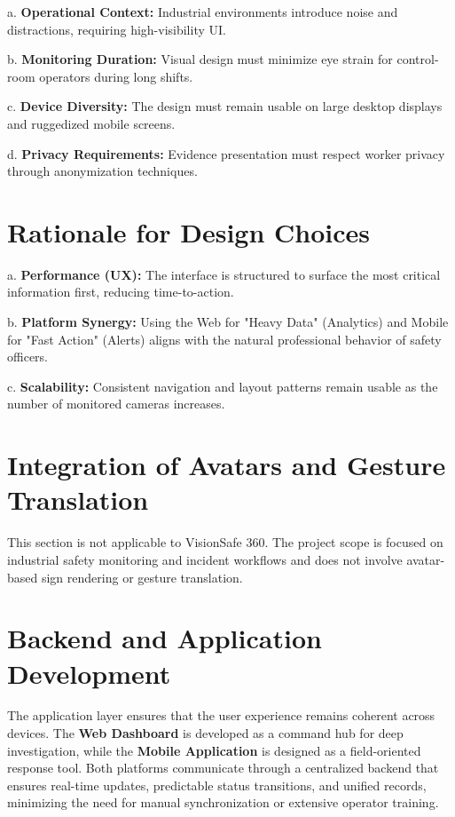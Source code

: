 a. \textbf{Operational Context:} Industrial environments introduce noise and distractions, requiring high-visibility UI.

b. \textbf{Monitoring Duration:} Visual design must minimize eye strain for control-room operators during long shifts.

c. \textbf{Device Diversity:} The design must remain usable on large desktop displays and ruggedized mobile screens.

d. \textbf{Privacy Requirements:} Evidence presentation must respect worker privacy through anonymization techniques.

\section{Rationale for Design Choices}

a. \textbf{Performance (UX):} The interface is structured to surface the most critical information first, reducing time-to-action.

b. \textbf{Platform Synergy:} Using the Web for "Heavy Data" (Analytics) and Mobile for "Fast Action" (Alerts) aligns with the natural professional behavior of safety officers.

c. \textbf{Scalability:} Consistent navigation and layout patterns remain usable as the number of monitored cameras increases.

\section{Integration of Avatars and Gesture Translation}

This section is not applicable to VisionSafe 360. The project scope is focused on industrial safety monitoring and incident workflows and does not involve avatar-based sign rendering or gesture translation.

\section{Backend and Application Development}

The application layer ensures that the user experience remains coherent across devices. The \textbf{Web Dashboard} is developed as a command hub for deep investigation, while the \textbf{Mobile Application} is designed as a field-oriented response tool. Both platforms communicate through a centralized backend that ensures real-time updates, predictable status transitions, and unified records, minimizing the need for manual synchronization or extensive operator training.
